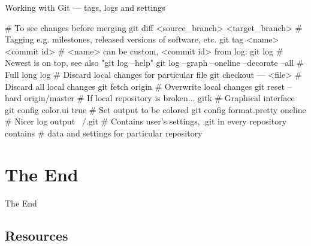 \documentclass[compress, ucs, xelatex, 11pt, xcolor=svgnames,
  hyperref={
    bookmarks=true,
    unicode=true,
    colorlinks=true,
    pdftitle={Linux, command line and MetaCentrum},
    plainpages=false,
    pdfauthor={Vojtech Zeisek},
    pdfsubject={Course about use of Linux command line, writing shell scripts and using MetaCentrum of CESNET},
    pdfcreator={XeLaTeX},
    pdfkeywords={Linux, GNU, BASH, shell, command line, MetaCentrum},
    linkcolor=DarkRed,
    anchorcolor=DarkBlue,
    citecolor=Indigo,
    filecolor=NavyBlue,
    menucolor=DarkMagenta,
    urlcolor=DarkBlue,
    pdftex},
  url={hyphens, lowtilde} %
  ]{beamer}
\begin{document}
\begin{frame}[fragile]{Working with Git --- tags, logs and settings}
  \begin{bashcode}
    # To see changes before merging
    git diff <source_branch> <target_branch>
    # Tagging e.g. milestones, released versions of software, etc.
    git tag <name> <commit id> # <name> can be custom, <commit id> from log:
    git log # Newest is on top, see also "git log --help"
    git log --graph --oneline --decorate --all # Full long log
    # Discard local changes for particular file
    git checkout --- <file>
    # Discard all local changes
    git fetch origin # Overwrite local changes
    git reset --hard origin/master # If local repository is broken...
    gitk # Graphical interface
    git config color.ui true # Set output to be colored
    git config format.pretty oneline # Nicer log output
    ~/.git # Contains user's settings, .git in every repository contains
           # data and settings for particular repository
  \end{bashcode}
\end{frame}

\section{The End}

\begin{frame}{The End}
  \tableofcontents[currentsection, sectionstyle=show/hide, hideothersubsections]
\end{frame}



\subsection{Resources}
\end{document}
